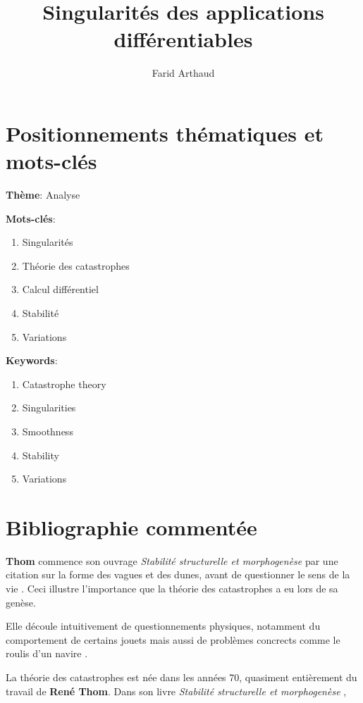 \documentclass{article}
\begin{document}
\title{Singularités des applications différentiables}
\author{Farid Arthaud}
\maketitle

\section{Positionnements thématiques et mots-clés}

\textbf{Thème}: Analyse

\textbf{Mots-clés}:
\begin{enumerate}
    \item Singularités
    \item Théorie des catastrophes
    \item Calcul différentiel
    \item Stabilité
    \item Variations
\end{enumerate}

\textbf{Keywords}:

\begin{enumerate}
    \item Catastrophe theory
    \item Singularities
    \item Smoothness
    \item Stability
    \item Variations
\end{enumerate}

\section{Bibliographie commentée}

\textbf{Thom} commence son ouvrage \textit{Stabilité structurelle et morphogenèse} par une citation sur la forme des vagues et des dunes, avant de questionner le sens de la vie \cite{thom}.
Ceci illustre l'importance que la théorie des catastrophes a eu lors de sa genèse.

Elle découle intuitivement de questionnements physiques, notamment du comportement de certains jouets \cite{bbcvid} mais aussi de problèmes concrects comme le roulis d'un navire \cite{Poston}.

La théorie des catastrophes est née dans les années 70, quasiment entièrement du travail de \textbf{René Thom}.
Dans son livre \textit{Stabilité structurelle et morphogenèse} \cite{thom},
\end{document}
